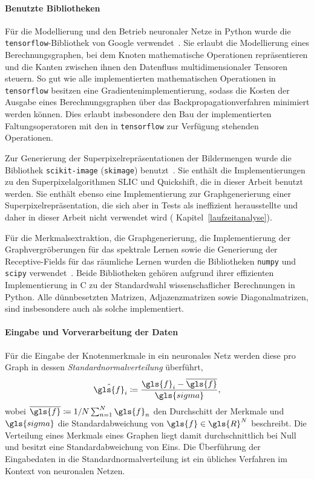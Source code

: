 \paragraph{Benutzte Bibliotheken}
\label{benutzte_bibliotheken}

Für die Modellierung und den Betrieb neuronaler Netze in Python wurde die \texttt{tensorflow}-Bibliothek von Google verwendet~\cite{tensorflow}.
Sie erlaubt die Modellierung eines Berechnungsgraphen, bei dem Knoten mathematische Operationen repräsentieren und die Kanten zwischen ihnen den Datenfluss multidimensionaler Tensoren steuern.
So gut wie alle implementierten mathematischen Operationen in \texttt{tensorflow} besitzen eine Gradientenimplementierung, sodass die Kosten der Ausgabe eines Berechnungsgraphen über das Backpropagationverfahren minimiert werden können.
Dies erlaubt insbesondere den Bau der implementierten Faltungsoperatoren mit den in \texttt{tensorflow} zur Verfügung stehenden Operationen.

Zur Generierung der Superpixelrepräsentationen der Bildermengen wurde die Bibliothek \texttt{scikit-image} (\texttt{skimage}) benutzt~\cite{scikit}.
Sie enthält die Implementierungen zu den Superpixelalgorithmen \gls{SLIC} und Quickshift, die in dieser Arbeit benutzt werden.
Sie enthält ebenso eine Implementierung zur Graphgenerierung einer Superpixelrepräsentation, die sich aber in Tests als ineffizient herausstellte und daher in dieser Arbeit nicht verwendet wird (\vgl{} Kapitel~\ref{laufzeitanalyse}).

Für die Merkmalsextraktion, die Graphgenerierung, die Implementierung der Graphvergröberungen für das spektrale Lernen sowie die Generierung der Receptive-Fields für das räumliche Lernen wurden die Bibliotheken \texttt{numpy} und \texttt{scipy} verwendet~\cite{numpy, scipy}.
Beide Bibliotheken gehören aufgrund ihrer effizienten Implementierung in C zu der Standardwahl wissenschaflicher Berechnungen in Python.
Alle dünnbesetzten Matrizen, \dhe{} Adjazenzmatrizen sowie Diagonalmatrizen, sind insbesondere auch als solche implementiert.

\paragraph{Eingabe und Vorverarbeitung der Daten}

Für die Eingabe der Knotenmerkmale in ein neuronales Netz werden diese pro Graph in dessen \emph{Standardnormalverteilung} überführt, \dhe{}~\cite{tensorflow}
\begin{equation*}
  \hat{\gls{f}}_i \coloneqq \frac{\gls{f}_i - \overline{\gls{f}}}{\gls{sigma}},
\end{equation*}
wobei $\overline{\gls{f}} \coloneqq 1/N \sum_{n=1}^N \gls{f}_n$ den Durchschitt der Merkmale und $\gls{sigma}$ die Standardabweichung von $\gls{f} \in \gls{R}^N$ beschreibt.
Die Verteilung eines Merkmals eines Graphen liegt damit durchschnittlich bei Null und besitzt eine Standardabweichung von Eins.
Die Überführung der Eingabedaten in die Standardnormalverteilung ist ein übliches Verfahren im Kontext von neuronalen Netzen.

